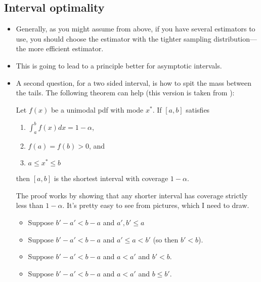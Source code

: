 \subsection{Interval optimality}

\begin{itemize}

\item Generally, as you might assume from above, if you have several
  estimators to use, you should choose the estimator with the tighter
  sampling distribution---the more efficient estimator.

\item This is going to lead to a principle better for asymptotic
  intervals.

\item A second question, for a two sided interval, is how to spit the
  mass between the tails.  The following theorem can help (this
  version is taken from \citealp{CB02}):

  \begin{thm}
    Let $f(x)$ be a unimodal pdf with mode $x^*$.  If $[a,b]$
    satisfies
    \begin{enumerate}
    \item $\int_a^b f(x) dx = 1 - \alpha$,
    \item $f(a) = f(b) > 0$, and
    \item $a \leq x^* \leq b$
    \end{enumerate}
    then $[a,b]$ is the shortest interval with coverage $1-\alpha$.
  \end{thm}

  The proof works by showing that any shorter interval has coverage
  strictly less than $1-\alpha$.  It's pretty easy to see from pictures,
  which I need to draw.

  \begin{itemize}
  \item Suppose $b'-a' < b-a$ and $a', b' \leq a$
  \item Suppose $b'-a' < b-a$ and $a' \leq a < b'$ (so then $b' < b$).
  \item Suppose $b'-a' < b-a$ and $a < a'$ and $b' < b$.
  \item Suppose $b'-a' < b-a$ and $a < a'$ and $b \leq b'$.
  \end{itemize}

\end{itemize}

